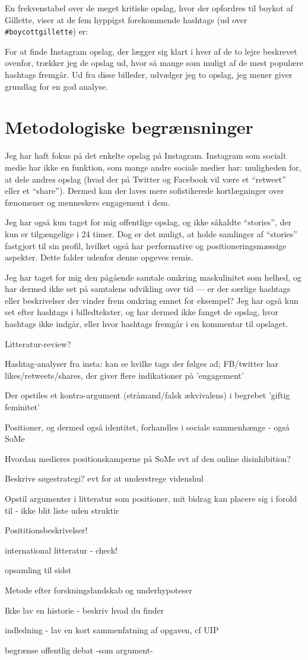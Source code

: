 En frekvenstabel over de meget kritiske opslag, hvor der opfordres 
til boykot af Gillette, viser at de fem hyppigst forekommende 
hashtags (ud over \texttt{\#boycottgillette}) er:

For at finde Instagram opslag, der lægger sig klart i hver af de 
to lejre beskrevet ovenfor, trækker jeg de opslag ud, hvor så 
mange som muligt af de mest populære hashtags fremgår. Ud fra 
disse billeder, udvælger jeg to opslag, jeg mener giver grundlag 
for en god analyse.

\section{Metodologiske begrænsninger}
Jeg har haft fokus på det enkelte opslag på Instagram. Instagram 
som socialt medie har ikke en funktion, som mange andre sociale 
medier har: muligheden for, at dele andres opslag (hvad der på 
Twitter og Facebook vil være et “retweet” eller et “share”).  
Dermed kan der laves mere sofistikerede kortlægninger over 
fænomener og menneskers engagement i dem.

Jeg har også kun taget for mig offentlige opslag, og ikke såkaldte 
“stories”, der kun er tilgængelige i 24 timer. Dog er det muligt, 
at holde samlinger af “stories” fastgjort til sin profil, hvilket 
også har performative og positioneringsmæssige aspekter. Dette 
falder udenfor denne opgeves remis.

Jeg har taget for mig den pågående samtale omkring maskulinitet 
som helhed, og har dermed ikke set på samtalens udvikling over tid 
— er der særlige hashtags eller beskrivelser der vinder frem 
omkring emnet for eksempel? Jeg har også kun set efter hashtags i 
billedtekster, og har dermed ikke fanget de opslag, hvor hashtags 
ikke indgår, eller hvor hashtags fremgår i en kommentar til 
opslaget.


Litteratur-review?

Hashtag-analyser fra insta: kan se hvilke tags der følges ad;
FB/twitter har likes/retweets/shares, der giver flere indikationer
på 'engagement'

Der opstiles et kontra-argument (stråmand/falsk ækvivalens) i
begrebet 'giftig feminitet'

Positioner, og dermed også identitet, forhandles i sociale
sammenhænge - også SoMe 

Hvordan medieres positionskamperne på SoMe evt af den online
disinhibition?

Beskrive søgestrategi? evt for at understrege videnshul

Opstil argumenter i litteratur som positioner, mit bidrag kan
placere sig i forold til - ikke blit liste uden struktir

Posititionsbeskrivelser!

international litteratur - check! 

opsamling til sidst

Metode efter forskningslandskab og underhypoteser

Ikke lav en historie - beskriv hvad du finder

indledning - lav en kort sammenfatning af opgaven, cf UIP

begrænse offentlig debat -som argument-
